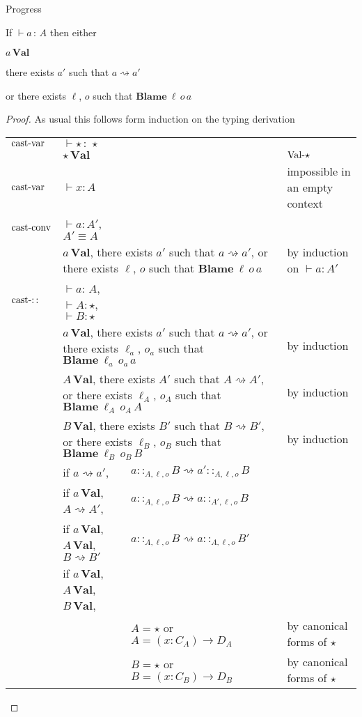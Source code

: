 \begin{thm}
Progress

If $\vdash a\,:\,A$ then either 

$a\,\textbf{Val}$

there exists $a'$ such that $a\rightsquigarrow a'$

or there exists $\ell$, $o$ such that $\textbf{Blame}\:\ell \,o\,a$
\end{thm}

\begin{proof}
As usual this follows form induction on the typing derivation

\begin{tabular}{lllll}
$\operatorname{cast-var}$ & $\vdash\star\,:\,\star$ &  &  & \tabularnewline
 & $\star\,\textbf{Val}$ &  &  & $\operatorname{Val-\star}$\tabularnewline
$\operatorname{cast-var}$ & $\vdash x:A$ &  &  & impossible in an empty context\tabularnewline
$\operatorname{cast-conv}$ & $\vdash a:A'$, $A'\equiv A$ &  &  & \tabularnewline
 & \multicolumn{3}{l}{$a\,\textbf{Val}$, there exists $a'$ such that $a\rightsquigarrow a'$,
or there exists $\ell$, $o$ such that $\textbf{Blame}\:\ell \,o\,a$} & by induction on $\vdash a:A'$\tabularnewline
$\operatorname{cast-::}$ & $\vdash a:\,A$, $\vdash A:\star$, $\vdash B:\star$ &  &  & \tabularnewline
 & \multicolumn{3}{l}{$a\,\textbf{Val}$, there exists $a'$ such that $a\rightsquigarrow a'$,
or there exists $\ell_{a}$, $o_{a}$ such that $\textbf{Blame}\:\ell _{a}\,o_{a}\,a$} & by induction\tabularnewline
 & \multicolumn{3}{l}{$A\,\textbf{Val}$, there exists $A'$ such that $A\rightsquigarrow A'$,
or there exists $\ell_{A}$, $o_{A}$ such that $\textbf{Blame}\:\ell _{A}\,o_{A}\,A$} & by induction\tabularnewline
 & \multicolumn{3}{l}{$B\,\textbf{Val}$, there exists $B'$ such that $B\rightsquigarrow B'$,
or there exists $\ell_{B}$, $o_{B}$ such that $\textbf{Blame}\:\ell _{B}\,o_{B}\,B$} & by induction\tabularnewline
 & if $a\rightsquigarrow a'$,  & $a::_{A,\ell ,o}B\rightsquigarrow a'::_{A,\ell ,o}B$ &  & \tabularnewline
 & if $a\,\textbf{Val}$, $A\rightsquigarrow A'$, & $a::_{A,\ell ,o}B\rightsquigarrow a::_{A',\ell ,o}B$ &  & \tabularnewline
 & if $a\,\textbf{Val}$, $A\,\textbf{Val}$, $B\rightsquigarrow B'$ & $a::_{A,\ell ,o}B\rightsquigarrow a::_{A,\ell ,o}B'$ &  & \tabularnewline
 & if $a\,\textbf{Val}$, $A\,\textbf{Val}$, $B\,\textbf{Val}$, &  &  & \tabularnewline
 &  & $A=\star$ or $A=\left(x:C_{A}\right)\rightarrow D_{A}$ &  & by canonical forms of $\star$\tabularnewline
 &  & $B=\star$ or $B=\left(x:C_{B}\right)\rightarrow D_{B}$ &  & by canonical forms of $\star$\tabularnewline

\end{tabular}
\end{proof}
